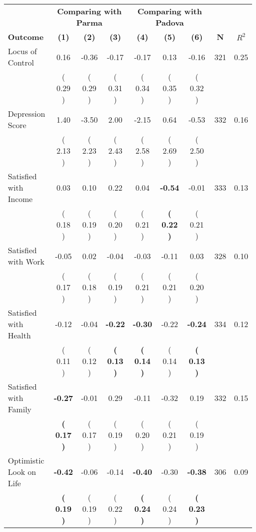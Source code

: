 \begin{tabular}{lcccccccc}
\toprule
 & \multicolumn{3}{c}{\textbf{Comparing with Parma}} & \multicolumn{3}{c}{\textbf{Comparing with Padova}} & \\
\cmidrule(lr){2-4} \cmidrule(lr){5-7} 
 \textbf{Outcome} & \textbf{(1)} & \textbf{(2)} & \textbf{(3)} & \textbf{(4)} & \textbf{(5)} & \textbf{(6)} & \textbf{N} & \textbf{$ R^2$} \\
\midrule
Locus of Control &      0.16 &     -0.36 &     -0.17 &     -0.17 &      0.13 &     -0.16 & 321 &       0.25 \\ 
 & (     0.29 ) & (     0.29 ) & (     0.31 ) & (     0.34 ) & (     0.35 ) & (     0.32 ) & \\
Depression Score &      1.40 &     -3.50 &      2.00 &     -2.15 &      0.64 &     -0.53 & 332 &       0.16 \\ 
 & (     2.13 ) & (     2.23 ) & (     2.43 ) & (     2.58 ) & (     2.69 ) & (     2.50 ) & \\
Satisfied with Income &      0.03 &      0.10 &      0.22 &      0.04 & \textbf{    -0.54} &     -0.01 & 333 &       0.13 \\ 
 & (     0.18 ) & (     0.19 ) & (     0.20 ) & (     0.21 ) & \textbf{(     0.22 )} & (     0.21 ) & \\
Satisfied with Work &     -0.05 &      0.02 &     -0.04 &     -0.03 &     -0.11 &      0.03 & 328 &       0.10 \\ 
 & (     0.17 ) & (     0.18 ) & (     0.19 ) & (     0.21 ) & (     0.21 ) & (     0.20 ) & \\
Satisfied with Health &     -0.12 &     -0.04 & \textbf{    -0.22} & \textbf{    -0.30} &     -0.22 & \textbf{    -0.24} & 334 &       0.12 \\ 
 & (     0.11 ) & (     0.12 ) & \textbf{(     0.13 )} & \textbf{(     0.14 )} & (     0.14 ) & \textbf{(     0.13 )} & \\
Satisfied with Family & \textbf{    -0.27} &     -0.01 &      0.29 &     -0.11 &     -0.32 &      0.19 & 332 &       0.15 \\ 
 & \textbf{(     0.17 )} & (     0.17 ) & (     0.19 ) & (     0.20 ) & (     0.21 ) & (     0.19 ) & \\
Optimistic Look on Life & \textbf{    -0.42} &     -0.06 &     -0.14 & \textbf{    -0.40} &     -0.30 & \textbf{    -0.38} & 306 &       0.09 \\ 
 & \textbf{(     0.19 )} & (     0.19 ) & (     0.22 ) & \textbf{(     0.24 )} & (     0.24 ) & \textbf{(     0.23 )} & \\

\end{tabular}
